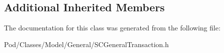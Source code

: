 \subsection*{Additional Inherited Members}


The documentation for this class was generated from the following file\+:\begin{DoxyCompactItemize}
\item 
Pod/\+Classes/\+Model/\+General/S\+C\+General\+Transaction.\+h\end{DoxyCompactItemize}
